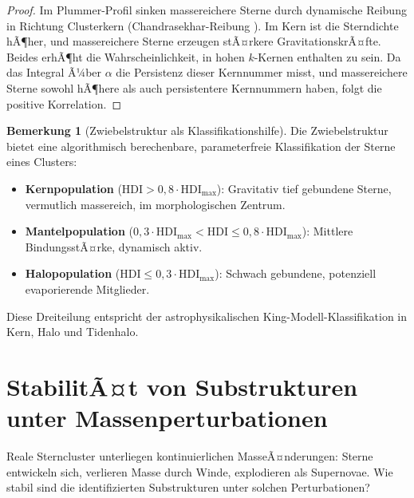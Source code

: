 ﻿\documentclass[a4paper,12pt]{report}
\theoremstyle{definition}
\newtheorem{bemerkung}{Bemerkung}
\begin{document}
\begin{proof}
Im Plummer-Profil sinken massereichere Sterne durch dynamische Reibung in Richtung Clusterkern (Chandrasekhar-Reibung \cite{chandrasekhar1943}). Im Kern ist die Sterndichte hÃ¶her, und massereichere Sterne erzeugen stÃ¤rkere GravitationskrÃ¤fte. Beides erhÃ¶ht die Wahrscheinlichkeit, in hohen $k$-Kernen enthalten zu sein. Da das Integral Ã¼ber $\alpha$ die Persistenz dieser Kernnummer misst, und massereichere Sterne sowohl hÃ¶here als auch persistentere Kernnummern haben, folgt die positive Korrelation.
\end{proof}

\begin{bemerkung}[Zwiebelstruktur als Klassifikationshilfe]
Die Zwiebelstruktur bietet eine algorithmisch berechenbare, parameterfreie Klassifikation der Sterne eines Clusters:
\begin{itemize}
    \item \textbf{Kernpopulation} ($\mathrm{HDI} > 0{,}8 \cdot \mathrm{HDI}_\mathrm{max}$): Gravitativ tief gebundene Sterne, vermutlich massereich, im morphologischen Zentrum.
    \item \textbf{Mantelpopulation} ($0{,}3 \cdot \mathrm{HDI}_\mathrm{max} < \mathrm{HDI} \leq 0{,}8 \cdot \mathrm{HDI}_\mathrm{max}$): Mittlere BindungsstÃ¤rke, dynamisch aktiv.
    \item \textbf{Halopopulation} ($\mathrm{HDI} \leq 0{,}3 \cdot \mathrm{HDI}_\mathrm{max}$): Schwach gebundene, potenziell evaporierende Mitglieder.
\end{itemize}
Diese Dreiteilung entspricht der astrophysikalischen King-Modell-Klassifikation in Kern, Halo und Tidenhalo.
\end{bemerkung}

\section{StabilitÃ¤t von Substrukturen unter Massenperturbationen}
\label{sec:stabilitaet}

Reale Sterncluster unterliegen kontinuierlichen MasseÃ¤nderungen: Sterne entwickeln sich, verlieren Masse durch Winde, explodieren als Supernovae. Wie stabil sind die identifizierten Substrukturen unter solchen Perturbationen?
\end{document}
